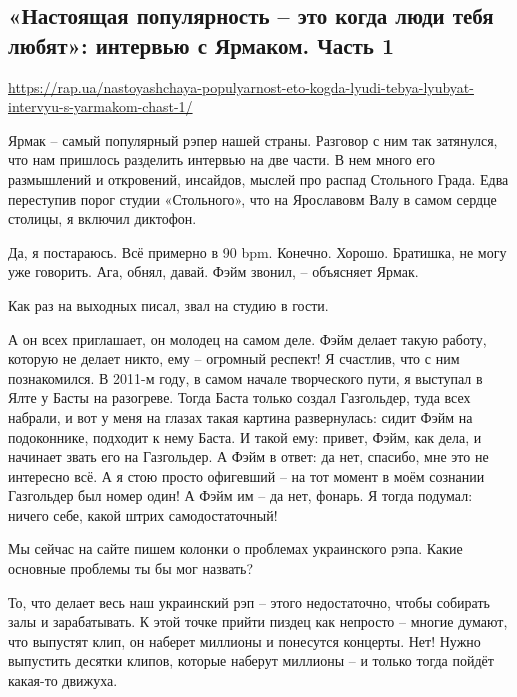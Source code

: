  
 

\subsection{«Настоящая популярность – это когда люди тебя любят»: интервью с Ярмаком. Часть 1}

\url{https://rap.ua/nastoyashchaya-populyarnost-eto-kogda-lyudi-tebya-lyubyat-intervyu-s-yarmakom-chast-1/}

Ярмак – самый популярный рэпер нашей страны. Разговор с ним так затянулся, что
нам пришлось разделить интервью на две части. В нем много его размышлений и
откровений, инсайдов, мыслей про распад Стольного  Града. Едва переступив порог
студии «Стольного», что на Ярославовм Валу в самом сердце столицы, я включил
диктофон.  

Да, я постараюсь. Всё примерно в 90 bpm. Конечно. Хорошо. Братишка, не могу уже
говорить. Ага, обнял, давай. Фэйм звонил, – объясняет Ярмак.

Как раз на выходных писал, звал на студию в гости.

А он всех приглашает, он молодец на самом деле. Фэйм делает такую работу,
которую не делает никто, ему – огромный респект! Я счастлив, что с ним
познакомился. В 2011-м году, в самом начале творческого пути, я выступал в Ялте
у Басты на разогреве. Тогда Баста только создал Газгольдер, туда всех набрали,
и вот у меня на глазах такая картина развернулась: сидит Фэйм на подоконнике,
подходит к нему Баста. И такой ему: привет, Фэйм, как дела, и начинает звать
его на Газгольдер. А Фэйм в ответ: да нет, спасибо, мне это не интересно всё. А
я стою просто офигевший – на тот момент в моём сознании Газгольдер был номер
один! А Фэйм им – да нет, фонарь. Я тогда подумал: ничего себе, какой штрих
самодостаточный!

Мы сейчас на сайте пишем колонки о проблемах украинского рэпа. Какие основные
проблемы ты бы мог назвать?

То, что делает весь наш украинский рэп – этого недостаточно, чтобы собирать
залы и зарабатывать. К этой точке прийти пиздец как непросто – многие думают,
что выпустят клип, он наберет миллионы и понесутся концерты. Нет! Нужно
выпустить десятки клипов, которые наберут миллионы – и только тогда пойдёт
какая-то движуха.

